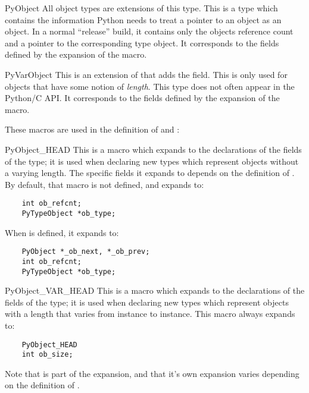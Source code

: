 \begin{ctypedesc}{PyObject}
  All object types are extensions of this type.  This is a type which
  contains the information Python needs to treat a pointer to an
  object as an object.  In a normal ``release'' build, it contains
  only the objects reference count and a pointer to the corresponding
  type object.  It corresponds to the fields defined by the
  expansion of the  macro.
\end{ctypedesc}

\begin{ctypedesc}{PyVarObject}
  This is an extension of  that adds the
   field.  This is only used for objects that have
  some notion of \emph{length}.  This type does not often appear in
  the Python/C API.  It corresponds to the fields defined by the
  expansion of the  macro.
\end{ctypedesc}

These macros are used in the definition of  and
:

\begin{csimplemacrodesc}{PyObject_HEAD}
  This is a macro which expands to the declarations of the fields of
  the  type; it is used when declaring new types which
  represent objects without a varying length.  The specific fields it
  expands to depends on the definition of
  .  By default, that macro is not
  defined, and  expands to:
  \begin{verbatim}
    int ob_refcnt;
    PyTypeObject *ob_type;
  \end{verbatim}
  When  is defined, it expands to:
  \begin{verbatim}
    PyObject *_ob_next, *_ob_prev;
    int ob_refcnt;
    PyTypeObject *ob_type;
  \end{verbatim}
\end{csimplemacrodesc}

\begin{csimplemacrodesc}{PyObject_VAR_HEAD}
  This is a macro which expands to the declarations of the fields of
  the  type; it is used when declaring new types which
  represent objects with a length that varies from instance to
  instance.  This macro always expands to:
  \begin{verbatim}
    PyObject_HEAD
    int ob_size;
  \end{verbatim}
  Note that  is part of the expansion, and
  that it's own expansion varies depending on the definition of
  .
\end{csimplemacrodesc}

